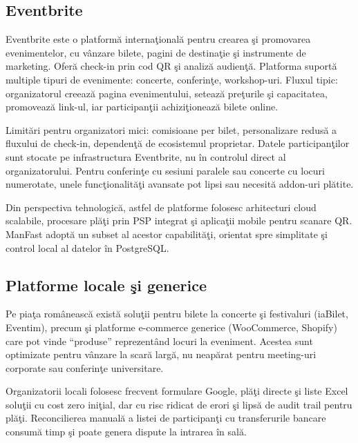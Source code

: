 \subsection{Eventbrite}

Eventbrite \cite{eventbrite2024} este o platform\u a interna\c tional\u a pentru crearea \c si promovarea evenimentelor, cu v\^anzare bilete, pagini de destina\c tie \c si instrumente de marketing. Ofer\u a check-in prin cod QR \c si analiz\u a audien\c t\u a. Platforma suport\u a multiple tipuri de evenimente: concerte, conferin\c te, workshop-uri. Fluxul tipic: organizatorul creeaz\u a pagina evenimentului, seteaz\u a pre\c turile \c si capacitatea, promoveaz\u a link-ul, iar participan\c tii achizi\c tioneaz\u a bilete online.

Limit\u ari pentru organizatori mici: comisioane per bilet, personalizare redus\u a a fluxului de check-in, dependen\c t\u a de ecosistemul proprietar. Datele participan\c tilor sunt stocate pe infrastructura Eventbrite, nu \^in controlul direct al organizatorului. Pentru conferin\c te cu sesiuni paralele sau concerte cu locuri numerotate, unele func\c tionalit\u a\c ti avansate pot lipsi sau necesit\u a addon-uri pl\u atite.

Din perspectiva tehnologic\u a, astfel de platforme folosesc arhitecturi cloud scalabile, procesare pl\u a\c ti prin PSP integrat \c si aplica\c tii mobile pentru scanare QR. ManFast adopt\u a un subset al acestor capabilit\u a\c ti, orientat spre simplitate \c si control local al datelor \^in PostgreSQL.




\subsection{Platforme locale \c si generice}

Pe pia\c ta rom\^aneasc\u a exist\u a solu\c tii pentru bilete la concerte \c si festivaluri (iaBilet, Eventim), precum \c si platforme e-commerce generice (WooCommerce, Shopify) care pot vinde ``produse'' reprezent\^and locuri la eveniment. Acestea sunt optimizate pentru v\^anzare la scar\u a larg\u a, nu neap\u arat pentru meeting-uri corporate sau conferin\c te universitare.

Organizatorii locali folosesc frecvent formulare Google, pl\u a\c ti directe \c si liste Excel solu\c tii cu cost zero ini\c tial, dar cu risc ridicat de erori \c si lips\u a de audit trail pentru pl\u a\c ti. Reconcilierea manual\u a a listei de participan\c ti cu transferurile bancare consum\u a timp \c si poate genera dispute la intrarea \^in sal\u a.

